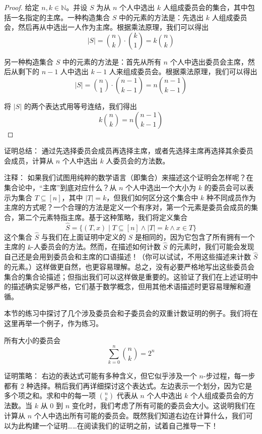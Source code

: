 \begin{proof}
    给定 $n,k \in \mathbb{N}$。并设 $S$ 为从 $n$ 个人中选出 $k$ 人组成委员会的集合，其中包括一名指定的主席。一种构造集合 $S$ 中的元素的方法是：先选出 $k$ 人组成委员会，然后再从中选出一人作为主席。根据乘法原理，我们可以得出
    \[|S| = {n \choose k} \cdot {k \choose 1} = k{n \choose k}\]

    另一种构造集合 $S$ 中的元素的方法是：首先从所有 $n$ 个人中选出委员会主席，然后从剩下的 $n-1$ 人中选出 $k-1$ 人来组成委员会。根据乘法原理，我们可以得出
    \[|S| = {n \choose 1} \cdot {n-1 \choose k-1} = n{n-1 \choose k-1}\]

    将 $|S|$ 的两个表达式用等号连结，我们得出
    \[k{n \choose k}=n{n-1 \choose k-1}\]
\end{proof}

\begin{questions}{证明总结：}
    通过先选择委员会成员再选择主席，或者先选择主席再选择其余委员会成员，计算从 $n$ 个人中选出 $k$ 人委员会的方法数。
\end{questions}

\begin{questions}{注释：}
    如果我们试图用纯粹的数学语言（即集合）来描述这个证明会怎样呢？在集合论中，``主席''到底对应什么？从 $n$ 个人中选出一个大小为 $k$ 的委员会可以表示为集合 $T \subseteq [n]$，其中 $|T| = k$，但我们如何区分这个集合中 $k$ 种不同成员作为主席的方式呢？一个合理的方法是定义一个有序对，第一个元素是委员会成员的集合，第二个元素特指主席。基于这种策略，我们将定义集合
    \[\hat{S} = \{(T, x) \mid T \subseteq [n] \land |T| = k \land x \in T\}\]
    这个集合 $\hat{S}$ 与我们在上面证明中定义的 $S$ 是相同的，因为它包含了所有拥有一个主席的 $k$-人委员会的方法。然而，在描述如何计数 $\hat{S}$ 的元素时，我们可能会发现自己还是会用到委员会和主席的口语描述！（你可以试试，不用这些描述来计数 $\hat{S}$ 的元素。）这样做更自然，也更容易理解。总之，没有必要严格地写出这些委员会集合的集合论描述；但指出我们可以这样做是重要的。这验证了我们在上述证明中的描述确实足够严格，它们基于数学概念，但用其他术语描述时更容易理解和遵循。

    本节的练习中探讨了几个涉及委员会和子委员会的双重计数证明的例子。我们将在这里再举一个例子，作为练习。
\end{questions}

\begin{proposition}{所有大小的委员会}
    \[\sum_{k=0}^{n} {n \choose k}=2^n\]
\end{proposition}

\begin{questions}{证明策略：}
    右边的表达式可能有多种含义，但它似乎涉及一个 $n$-步过程，每一步都有 $2$ 种选择。稍后我们再详细探讨这个表达式。左边表示一个划分，因为它是多个项之和。求和中的每一项 ${n \choose k}$ 代表从 $n$ 个人中选出 $k$ 个人组成委员会的方法数。当 $k$ 从 $0$ 到 $n$ 变化时，我们考虑了所有可能的委员会大小。这说明我们在计算从 $n$ 个人中选出所有可能的委员会。既然我们知道右边在计算什么，我们可以为此构建一个证明……在阅读我们的证明之前，试着自己推导一下！
\end{questions}

